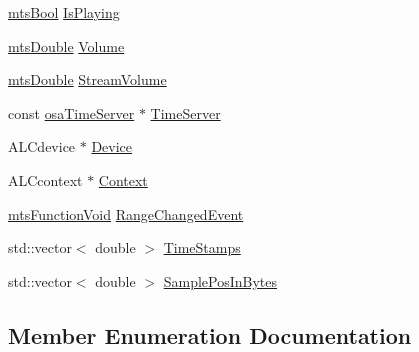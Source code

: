 \begin{DoxyCompactItemize}
\item 
\hyperlink{mts_generic_object_proxy_8h_ae2e26261f1874d4aa4ee374ece7646bd}{mts\+Bool} \hyperlink{classosa_open_a_l_a83e535cc470a05a2031c35f4a549ec74}{Is\+Playing}
\item 
\hyperlink{mts_generic_object_proxy_8h_a31e76b0190a8d3f9838626cd7b47bd75}{mts\+Double} \hyperlink{classosa_open_a_l_a37e986d3fd52a05679b555fff97910c7}{Volume}
\item 
\hyperlink{mts_generic_object_proxy_8h_a31e76b0190a8d3f9838626cd7b47bd75}{mts\+Double} \hyperlink{classosa_open_a_l_aac985710448fc31ea8b31240a1f5a2e1}{Stream\+Volume}
\item 
const \hyperlink{classosa_time_server}{osa\+Time\+Server} $\ast$ \hyperlink{classosa_open_a_l_a7b9cfbdfb0f92f71c39a223392a34f11}{Time\+Server}
\item 
A\+L\+Cdevice $\ast$ \hyperlink{classosa_open_a_l_ac256dbad70ce7706711a7138cb883ef1}{Device}
\item 
A\+L\+Ccontext $\ast$ \hyperlink{classosa_open_a_l_a55912d0e1beccbc92573ca8a554158f7}{Context}
\item 
\hyperlink{classmts_function_void}{mts\+Function\+Void} \hyperlink{classosa_open_a_l_a77e891d189f6d4a1ef963e7920a95cbd}{Range\+Changed\+Event}
\item 
std\+::vector$<$ double $>$ \hyperlink{classosa_open_a_l_aa8fcaf462af83212a65784a5d46ff592}{Time\+Stamps}
\item 
std\+::vector$<$ double $>$ \hyperlink{classosa_open_a_l_a91923ec0ba88fb79b905e16436e6b788}{Sample\+Pos\+In\+Bytes}
\end{DoxyCompactItemize}


\subsection{Member Enumeration Documentation}
\hypertarget{classosa_open_a_l_a909b566bfee85658c0108a38937545aa}{}
